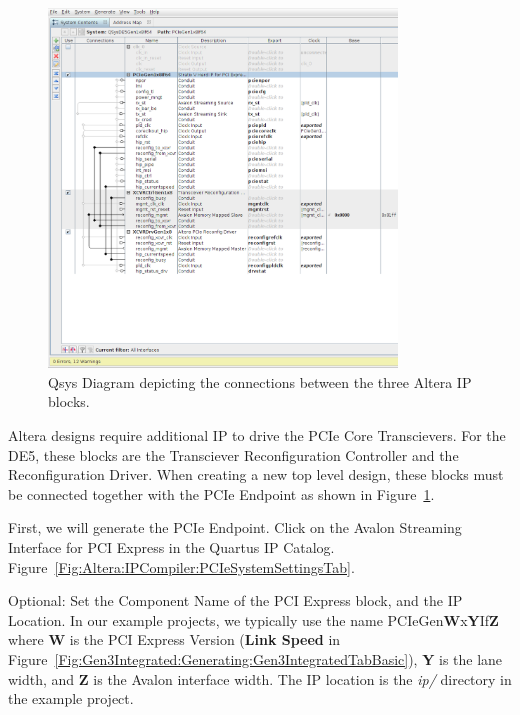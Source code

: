 \documentclass{refrep}
\newcommand{\Directory}[1]{\textit{#1}}
\newcommand{\ConfigSetting}[1]{\textbf{#1}}
\begin{document}
\begin{figure}[H]
  \includegraphics[width=350px,center]{QsysPCIExpSystemTrim.png}
  \caption{Qsys Diagram depicting the connections between the three Altera IP blocks.}
  \label{Fig:Altera:QsysMegawizard:Megawizard:QsysPCIExpSystemTrim}
\end{figure}

Altera designs require additional IP to drive the PCIe Core Transcievers. For the
DE5, these blocks are the Transciever Reconfiguration Controller and the
Reconfiguration Driver. When creating a new top level design, these blocks must be
connected together with the PCIe Endpoint as shown in
Figure~\ref{Fig:Altera:QsysMegawizard:Megawizard:QsysPCIExpSystemTrim}.

First, we will generate the PCIe Endpoint. Click on the Avalon Streaming
Interface for PCI Express in the Quartus IP Catalog.
Figure~\ref{Fig:Altera:IPCompiler:PCIeSystemSettingsTab}.

Optional: Set the Component Name of the PCI Express block, and the IP
Location. In our example projects, we typically use the name
PCIeGen\textbf{W}x\textbf{Y}If\textbf{Z} where \textbf{W} is the PCI Express
Version (\ConfigSetting{Link Speed} in
Figure~\ref{Fig:Gen3Integrated:Generating:Gen3IntegratedTabBasic}), \textbf{Y}
is the lane width, and \textbf{Z} is the Avalon interface width. The IP location
is the \Directory{ip/} directory in the example project.
\end{document}
